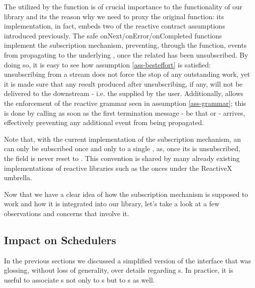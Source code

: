 
The  utilized by the  function is of crucial importance to the functionality of our library and its the reason why we need to proxy the original  function: its implementation, in fact, embeds two of the reactive contract assumptions introduced previously. The safe onNext/onError/onCompleted functions implement the subscription mechanism, preventing, through the  function, events from propagating to the underlying , once the related  has been unsubscribed. By doing so, it is easy to see how assumption \ref{ass-besteffort} is satisfied: unsubscribing from a stream does not force the stop of any outstanding work, yet it is made sure that any result produced after unsubscribing, if any, will not be delivered to the downstream  - i.e. the  supplied by the user. Additionally,  allows the enforcement of the reactive grammar seen in assumption \ref{ass-grammar}; this is done by calling  as soon as the first termination message - be that  or  - arrives, effectively preventing any additional event from being propagated.

Note that, with the current implementation of the subscription mechanism, an  can only be subscribed once and only to a single , as, once its  is unsubscribed, the  field is never reset to . This convention is shared by many already existing implementations of reactive libraries such as the onces under the ReactiveX umbrella\cite{rxjava-wiki}.

Now that we have a clear idea of how the subscription mechanism is supposed to work and how it is integrated into our library, let's take a look at a few observations and concerns that involve it. 

\subsection{Impact on Schedulers}

In the previous sections we discussed a simplified version of the  interface that was glossing, without loss of generality, over details regarding s. In practice, it is useful to associate s not only to s but to s as well. 

